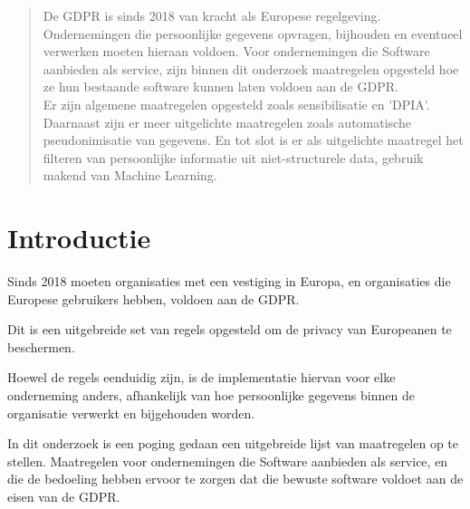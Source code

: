 \documentclass[a0,portrait]{a0poster}
\begin{document}
\begin{multicols}{2} %


\color{HoGentAccent1} %

\begin{abstract}
De GDPR is sinds 2018 van kracht als Europese regelgeving. Ondernemingen die persoonlijke gegevens opvragen, bijhouden en eventueel verwerken moeten hieraan voldoen. Voor ondernemingen die Software aanbieden als service, zijn binnen dit onderzoek maatregelen opgesteld hoe ze hun bestaande software kunnen laten voldoen aan de GDPR. \\ Er zijn algemene maatregelen opgesteld zoals sensibilisatie en 'DPIA'.  Daarnaast zijn er meer uitgelichte maatregelen zoals automatische pseudonimisatie van gegevens. En tot slot is er als uitgelichte maatregel het filteren van persoonlijke informatie uit niet-structurele data, gebruik makend van Machine Learning. 
\end{abstract}

\color{HoGentAccent1} 
\section*{Introductie}
\color{black}
\color{black}
Sinds 2018 moeten organisaties met een vestiging in Europa, en organisaties die Europese gebruikers hebben, voldoen aan de GDPR. 

Dit is een uitgebreide set van regels opgesteld om de privacy van Europeanen te beschermen. 

Hoewel de regels eenduidig zijn, is de implementatie hiervan voor elke onderneming anders, afhankelijk van hoe persoonlijke gegevens binnen de organisatie verwerkt en bijgehouden worden.

In dit onderzoek is een poging gedaan een uitgebreide lijst van maatregelen op te stellen. Maatregelen voor ondernemingen die Software aanbieden als service, en die de bedoeling hebben ervoor te zorgen dat die bewuste software voldoet aan de eisen van de GDPR. 


\end{multicols}
\end{document}
